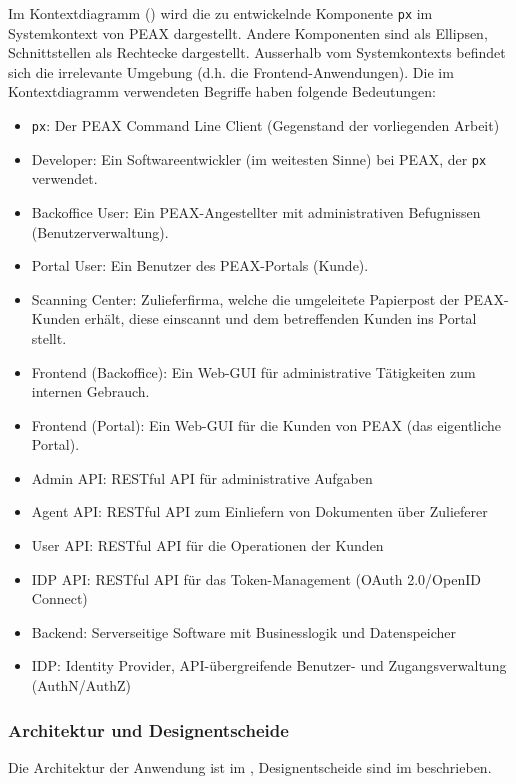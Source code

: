 Im Kontextdiagramm () wird die zu entwickelnde Komponente \texttt{px} im Systemkontext von PEAX dargestellt. Andere Komponenten sind als Ellipsen, Schnittstellen als Rechtecke dargestellt. Ausserhalb vom Systemkontexts befindet sich die irrelevante Umgebung (d.h. die Frontend-Anwendungen). Die im Kontextdiagramm verwendeten Begriffe haben folgende Bedeutungen:

\begin{itemize}
	\item \texttt{px}: Der PEAX Command Line Client (Gegenstand der vorliegenden Arbeit)
	\item Developer: Ein Softwareentwickler (im weitesten Sinne) bei PEAX, der \texttt{px} verwendet.
	\item Backoffice User: Ein PEAX-Angestellter mit administrativen Befugnissen (Benutzerverwaltung).
	\item Portal User: Ein Benutzer des PEAX-Portals (Kunde).
	\item Scanning Center: Zulieferfirma, welche die umgeleitete Papierpost der PEAX-Kunden erhält, diese einscannt und dem betreffenden Kunden ins Portal stellt.
	\item Frontend (Backoffice): Ein Web-GUI für administrative Tätigkeiten zum internen Gebrauch.
	\item Frontend (Portal): Ein Web-GUI für die Kunden von PEAX (das eigentliche Portal).
	\item Admin API: RESTful API für administrative Aufgaben
	\item Agent API: RESTful API zum Einliefern von Dokumenten über Zulieferer
	\item User API: RESTful API für die Operationen der Kunden
	\item IDP API: RESTful API für das Token-Management (OAuth 2.0/OpenID Connect)
	\item Backend: Serverseitige Software mit Businesslogik und Datenspeicher
	\item IDP: Identity Provider, API-übergreifende Benutzer- und Zugangsverwaltung (AuthN/AuthZ)
\end{itemize}

\subsubsection{Architektur und Designentscheide}

Die Architektur der Anwendung ist im , Designentscheide sind im  beschrieben.


